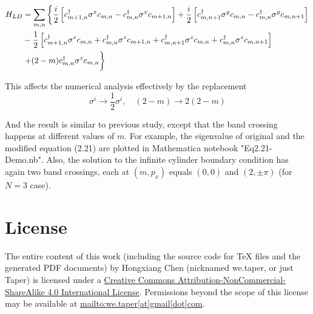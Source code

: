 \documentclass{article}
\begin{document}
    \begin{align}
        H_{LD} &= \sum_{m,n}\left\{
            \frac{i}{2} \left[ c^\dagger_{m+1,n}\sigma^x c_{m,n}
                - c^\dagger_{m,n}\sigma^x c_{m+1,n}\right]
            + \frac{i}{2} \left[ c^\dagger_{m,n+1}\sigma^y c_{m,n}
                - c^\dagger_{m,n}\sigma^y c_{m,n+1} \right]
            \right.
            \nonumber\\
            &- \frac{1}{2}\left[
                c^\dagger_{m+1,n}\sigma^z c_{m,n}
                + c^\dagger_{m,n}\sigma^z c_{m+1,n}
                + c^\dagger_{m,n+1}\sigma^z c_{m,n}
                + c^\dagger_{m,n}\sigma^z c_{m,n+1}
            \right]
            \nonumber\\
            & \left. + (2-m) c^\dagger_{m,n}\sigma^z c_{m,n}
            \vphantom{\frac12}
        \right\}
    \end{align}

    This affects the numerical analysis effectively by the replacement
    $$\sigma^i \to \frac{1}{2}\sigma^i,\quad
        (2-m) \to 2(2-m) $$

    And the result is similar to previous study, except that the band
    crossing happens at different values of $m$. For example, the
    eigenvalue of original and the modified equation (2.21) are
    plotted in Mathematica notebook "Eq2.21-Demo.nb". Also, the
    solution to the infinite cylinder boundary condition has again two
    band crossings, each at $(m,p_x)$ equals $(0,0)$ and $(2,\pm\pi)$
    (for $N=3$ case).


{}


\printnomenclature
\section{License}
The entire content of this work (including the source code
for TeX files and the generated PDF documents) by 
Hongxiang Chen (nicknamed we.taper, or just Taper) is
licensed under a 
\href{http://creativecommons.org/licenses/by-nc-sa/4.0/}{Creative 
Commons Attribution-NonCommercial-ShareAlike 4.0 International 
License}. Permissions beyond the scope of this 
license may be available at \url{mailto:we.taper[at]gmail[dot]com}.
\end{document}
